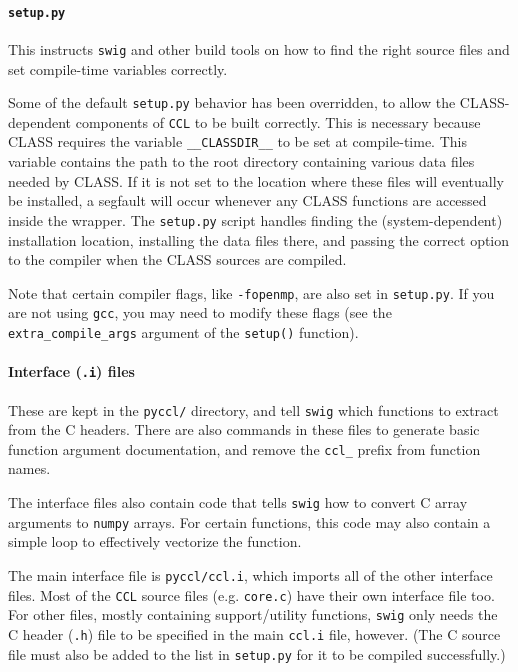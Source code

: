 \documentclass[\docopts]{\docclass}
\begin{document}
\paragraph{{\tt setup.py}} This instructs {\tt swig} and other build tools on how to find the right source files and set compile-time variables correctly.

Some of the default {\tt setup.py} behavior has been overridden, to allow the CLASS-dependent components of {\tt CCL} to be built correctly. This is necessary because CLASS requires the variable {\tt \_\_CLASSDIR\_\_} to be set at compile-time. This variable contains the path to the root directory containing various data files needed by CLASS. If it is not set to the location where these files will eventually be installed, a segfault will occur whenever any CLASS functions are accessed inside the wrapper. The {\tt setup.py} script handles finding the (system-dependent) installation location, installing the data files there, and passing the correct option to the compiler when the CLASS sources are compiled.

Note that certain compiler flags, like {\tt -fopenmp}, are also set in {\tt setup.py}. If you are not using {\tt gcc}, you may need to modify these flags (see the {\tt extra\_compile\_args} argument of the {\tt setup()} function).

\paragraph{Interface ({\tt .i}) files} These are kept in the {\tt pyccl/} directory, and tell {\tt swig} which functions to extract from the C headers. There are also commands in these files to generate basic function argument documentation, and remove the {\tt ccl\_} prefix from function names.

The interface files also contain code that tells {\tt swig} how to convert C array arguments to {\tt numpy} arrays. For certain functions, this code may also contain a simple loop to effectively vectorize the function.

The main interface file is {\tt pyccl/ccl.i}, which imports all of the other interface files. Most of the {\tt CCL} source files (e.g. {\tt core.c}) have their own interface file too. For other files, mostly containing support/utility functions, {\tt swig} only needs the C header ({\tt .h}) file to be specified in the main {\tt ccl.i} file, however. (The C source file must also be added to the list in {\tt setup.py} for it to be compiled successfully.)
\end{document}
